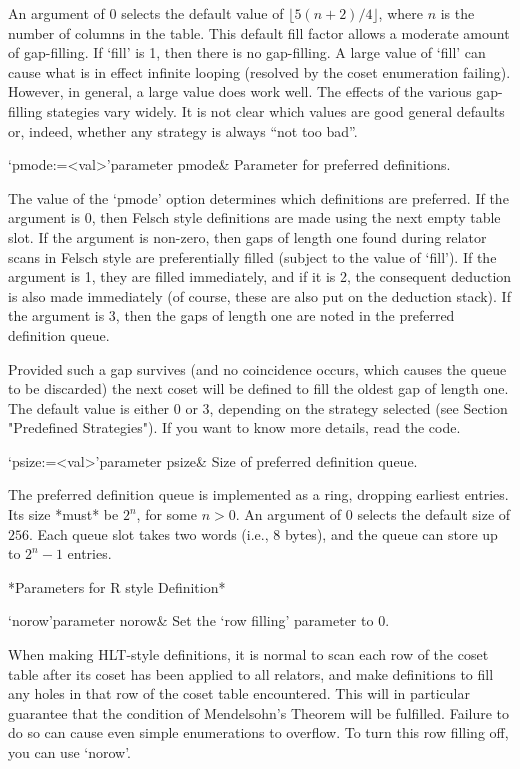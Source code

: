 An  argument of  0  selects  the default  value  of $\lfloor  5(n+2)/4
\rfloor$,  where $n$  is the  number of  columns in  the  table.  This
default  fill factor  allows  a moderate  amount  of gap-filling.   If
`fill' is  1, then there is  no gap-filling.  A large  value of `fill'
can cause  what is in effect  infinite looping (resolved  by the coset
enumeration failing).   However, in general,  a large value  does work
well.  The  effects of the various gap-filling  stategies vary widely.
It is  not clear  which values are  good general defaults  or, indeed,
whether any strategy is always ``not too bad''.


\>`pmode:=<val>'{parameter pmode}&
Parameter for preferred definitions.

The  value of  the  `pmode' option  determines  which definitions  are
preferred.  If  the argument is  0, then Felsch style  definitions are
made using  the next empty table  slot.  If the  argument is non-zero,
then gaps of length one found during relator scans in Felsch style are
preferentially  filled  (subject to  the  value  of  `fill').  If  the
argument  is 1,  they are  filled  immediately, and  if it  is 2,  the
consequent deduction  is also made  immediately (of course,  these are
also put on the deduction stack).  If the argument is 3, then the gaps
of length one are noted in the preferred definition queue.

Provided such a gap survives  (and no coincidence occurs, which causes
the queue to be discarded) the  next coset will be defined to fill the
oldest  gap of  length  one.  The  default  value is  either  0 or  3,
depending   on  the   strategy  selected   (see   Section  "Predefined
Strategies").  If you want to know more details, read the code.


\>`psize:=<val>'{parameter psize}&
Size of preferred definition queue.

The  preferred definition  queue is  implemented as  a  ring, dropping
earliest  entries.  Its  size *must*  be  $2^n$, for  some $n>0$.   An
argument  of 0 selects  the default  size of  $256$.  Each  queue slot
takes two words (i.e., 8 bytes), and the queue can store up to $2^n-1$
entries.

*Parameters for R style Definition*

\>`norow'{parameter norow}&
Set the `row filling' parameter to 0.

When making  HLT-style definitions, it is  normal to scan  each row of
the coset table after its coset  has been applied to all relators, and
make definitions  to fill  any holes  in that row  of the  coset table
encountered. This  will in particular guarantee that  the condition of
Mendelsohn's Theorem  will be fulfilled.   Failure to do so  can cause
even simple enumerations to overflow.   To turn this row filling off,
you can use `norow'.

